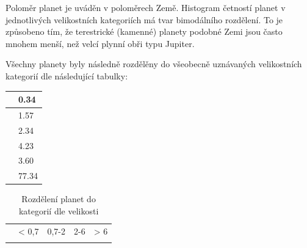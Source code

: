 \documentclass[a4paper,12pt]{article}
\begin{document}
\setlength{\columnsep}{0.43\textwidth}
\begin{multicols}{2}
\begin{minipage}{0.7\textwidth}
Poloměr planet je uváděn v poloměrech Země. Histogram četností planet v jednotlivých velikostních kategoriích má tvar bimodálního rozdělení. To je způsobeno tím, že terestrické (kamenné) planety podobné Zemi jsou často mnohem menší, než velcí plynní obři typu Jupiter.

Všechny planety byly následně rozdělěny do všeobecně uznávaných velikostních kategorií dle následující tabulky:
\end{minipage}
\begin{minipage}{0.3\textwidth}
\begin{tabular}{| l| l|}
   \hline
{\cellcolor[rgb]{0.85, 0.85, 0.85}{ Min }} & 0.34 \\ 
   \hline
{\cellcolor[rgb]{0.85, 0.85, 0.85}{ Qu1 }} & 1.57 \\ 
   \hline
{\cellcolor[rgb]{0.85, 0.85, 0.85}{ Median }} & 2.34 \\ 
   \hline
{\cellcolor[rgb]{0.85, 0.85, 0.85}{ Mean }} & 4.23 \\ 
   \hline
{\cellcolor[rgb]{0.85, 0.85, 0.85}{ Qu3 }} & 3.60 \\ 
   \hline
{\cellcolor[rgb]{0.85, 0.85, 0.85}{ Max }} & 77.34 \\ 
   \hline
\end{tabular}\end{minipage}
\end{multicols}

\begin{table}[ht]
\centering
\begin{tabular}{| l| l| l| l| l|}
  \hline
 & {\cellcolor[rgb]{0.85, 0.85, 0.85}{ Mercurian }} & {\cellcolor[rgb]{0.85, 0.85, 0.85}{ Earth }} & {\cellcolor[rgb]{0.85, 0.85, 0.85}{ Neptunian }} & {\cellcolor[rgb]{0.85, 0.85, 0.85}{ Jovian }} \\ 
  \hline
{\cellcolor[rgb]{0.85, 0.85, 0.85}{ Poloměr [poloměry Země] }} & < 0,7 & 0,7-2 & 2-6 & > 6 \\ 
   \hline
{\cellcolor[rgb]{0.85, 0.85, 0.85}{ Počet }} & {\cellcolor[rgb]{ 0.980959634424981 ,  1 ,  0.980959634424981 }{ 25 }} & {\cellcolor[rgb]{ 0.0677837014470678 ,  1 ,  0.0677837014470678 }{ 1224 }} & {\cellcolor[rgb]{ 0 ,  1 ,  0 }{ 1313 }} & {\cellcolor[rgb]{ 0.546077684691546 ,  1 ,  0.546077684691546 }{ 596 }} \\ 
   \hline
\end{tabular}
\caption{Rozdělení planet do kategorií dle velikosti} 
\end{table}
\newpage
\end{document}
